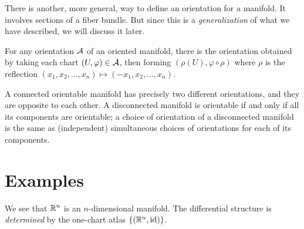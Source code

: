 \begin{remark}
There is another, more general, way to define an orientation for a
manifold. It involves sections of a fiber bundle. But since this is a
\emph{generalization} of what we have described, we will discuss it
later.
\end{remark}

\begin{definition}
For any orientation $\mathcal{A}$ of an oriented manifold, there is the 
orientation obtained by taking each chart $(U,\varphi)\in\mathcal{A}$,
then forming $(\rho(U),\varphi\circ\rho)$ where $\rho$ is the reflection
$(x_{1}, x_{2},\dots, x_{n})\mapsto(-x_{1},x_{2},\dots,x_{n})$. 
\end{definition}

\begin{proposition}
A connected orientable manifold has precisely two different
orientations, and they are opposite to each other. A disconnected
manifold is orientable if and only if all its components are orientable;
a choice of orientation of a disconnected manifold is the same as
(independent) simultaneous choices of orientations for each of its components.
\end{proposition}

\section{Examples}

\begin{example}
We see that $\mathbb{R}^{n}$ is an $n$-dimensional manifold. The differential
structure is \emph{determined} by the one-chart atlas $\{(\mathbb{R}^{n},\operatorname{id})\}$.
\end{example}